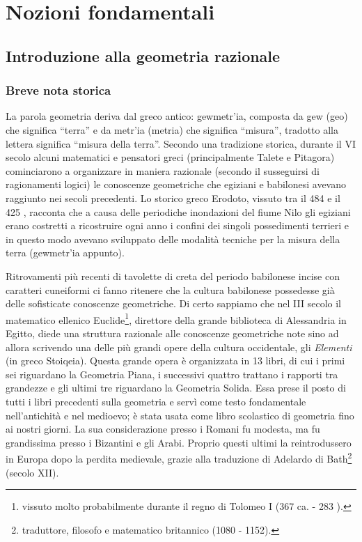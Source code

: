 \chapter{Nozioni fondamentali}

\section{Introduzione alla geometria razionale}
\subsection{Breve nota storica}
La parola geometria deriva dal greco antico: \textgreek{gewmetr'ia}, composta da \textgreek{gew} (geo) che significa ``terra'' e da \textgreek{metr'ia} (metria) che significa ``misura'', tradotto alla lettera significa ``misura della terra''. Secondo una tradizione storica, durante il VI secolo \aC{} alcuni matematici e pensatori greci (principalmente Talete e Pitagora) cominciarono a organizzare in maniera razionale (secondo il susseguirsi di ragionamenti logici) le conoscenze geometriche che egiziani e babilonesi avevano raggiunto nei secoli precedenti. Lo storico greco Erodoto, vissuto tra il 484 \aC{} e il 425 \aC, racconta che a causa delle periodiche inondazioni del fiume Nilo gli egiziani erano costretti a ricostruire ogni anno i confini dei singoli possedimenti terrieri e in questo modo avevano sviluppato delle modalità tecniche per la misura della terra (\textgreek{gewmetr'ia} appunto).

Ritrovamenti più recenti di tavolette di creta del periodo babilonese incise con caratteri cuneiformi ci fanno ritenere che la cultura babilonese possedesse già delle sofisticate conoscenze geometriche. Di certo sappiamo che nel III secolo \aC{} il matematico ellenico Euclide\footnote{vissuto molto probabilmente durante il regno di Tolomeo I (367 \aC{} ca. - 283 \aC).}, direttore della grande biblioteca di Alessandria in Egitto, diede una struttura razionale alle conoscenze geometriche note sino ad allora scrivendo una delle più grandi opere della cultura occidentale, gli \emph{Elementi} (in greco \textgreek{Stoiqeia}). Questa grande opera è organizzata in 13 libri, di cui i primi sei riguardano la Geometria Piana, i successivi quattro trattano i rapporti tra grandezze e gli ultimi tre riguardano la Geometria Solida. Essa prese il posto di tutti i libri precedenti sulla geometria e servì come testo fondamentale nell'antichità e nel medioevo; è stata usata come libro scolastico di geometria fino ai nostri giorni. La sua considerazione presso i Romani fu modesta, ma fu grandissima presso i Bizantini e gli Arabi. Proprio questi ultimi la reintrodussero in Europa dopo la perdita medievale, grazie alla traduzione di Adelardo di Bath\footnote{traduttore, filosofo e matematico britannico (1080 - 1152).} (secolo XII).

